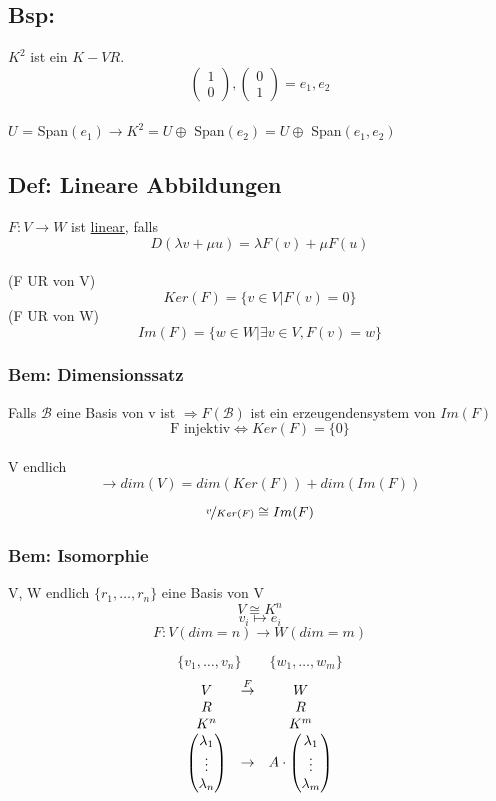 \documentclass[titlepage,12pt,a4paper,ngerman]{report}
\begin{document}
\subsection{Bsp:} $K^2$ ist ein $K - VR.$\\
$$\begin{pmatrix}1 \\ 0 \end{pmatrix} , \begin{pmatrix}0 \\ 1 \end{pmatrix} = e_1, e_2$$\\
$U$ = Span$(e_1) \rightarrow K^2 = U \oplus$ Span$(e_2) = U \oplus$ Span$(e_1, e_2)$

\subsection{Def: Lineare Abbildungen}
$ F: V\rightarrow W $ ist \underline{linear}, falls $$D(\lambda v+\mu u ) = \lambda F(v) + \mu F(u)$$\\
(F UR von V)
$$ Ker(F) =\{ v \in V \vert  F(v) = 0 \}$$
(F UR von W)
$$ Im(F) = \{ w \in W \vert \exists v \in V, F(v) = w\}$$
\subsubsection{Bem: Dimensionssatz}
Falls $\mathcal{B}$ eine Basis von v ist $\Rightarrow F(\mathcal{B})$ ist ein erzeugendensystem von $Im(F)$\\ 
$$\textrm{F injektiv} \Leftrightarrow Ker(F) = \{0\}$$\\
V endlich $$\rightarrow dim(V) = dim(Ker(F)) + dim(Im(F))$$

$$ \nicefrac{v}{Ker(F)} \cong Im(F)$$
\subsubsection{Bem: Isomorphie}
V, W endlich $\{r_1,\dots ,r_n\}$ eine Basis von V
$$ V \cong K^n$$
$$v_i \mapsto e_i$$
$$F: V (dim = n ) \to W (dim = m)$$

$$\{v_1,\dots ,v_n\} \qquad \{w_1,\dots ,w_m\}$$
$$\begin{array}{ccc}
V & \buildrel F \over \rightarrow &  W \\
R & & R \\
K^n & & K^m \\
\begin{pmatrix}
\lambda_1\\
\vdots\\
\lambda_n
\end{pmatrix} & \rightarrow & A \cdot \begin{pmatrix}
\lambda_1 \\
\vdots \\
\lambda_m
\end{pmatrix}
\end{array}$$
\end{document}
